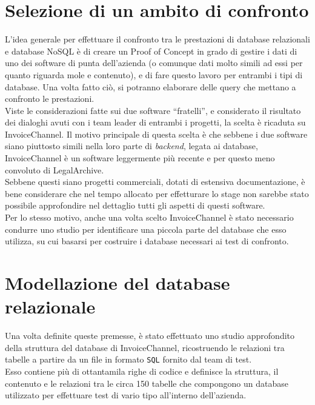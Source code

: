 \section{Selezione di un ambito di confronto}
L'idea generale per effettuare il confronto tra le prestazioni di database relazionali e database NoSQL è di creare un \gls{Proof of Concept} in grado di gestire i dati di uno dei software di punta dell'azienda (o comunque dati molto simili ad essi per quanto riguarda mole e contenuto), e di fare questo lavoro per entrambi i tipi di database. Una volta fatto ciò, si potranno elaborare delle query che mettano a confronto le prestazioni.\\

\noindent Viste le considerazioni fatte sui due software ``fratelli'', e considerato il risultato dei dialoghi avuti con i team leader di entrambi i progetti, la scelta è ricaduta su InvoiceChannel. Il motivo principale di questa scelta è che sebbene i due software siano piuttosto simili nella loro parte di \textit{backend}, legata ai database, InvoiceChannel è un software leggermente più recente e per questo meno convoluto di LegalArchive.\\
Sebbene questi siano progetti commerciali, dotati di estensiva documentazione, è bene considerare che nel tempo allocato per effetturare lo stage non sarebbe stato possibile approfondire nel dettaglio tutti gli aspetti di questi software.\\
Per lo stesso motivo, anche una volta scelto InvoiceChannel è stato necessario condurre uno studio per identificare una piccola parte del database che esso utilizza, su cui basarsi per costruire i database necessari ai test di confronto.\\


\section{Modellazione del database relazionale}
Una volta definite queste premesse, è stato effettuato uno studio approfondito della struttura del database di InvoiceChannel, ricostruendo le relazioni tra tabelle a partire da un file in formato \texttt{SQL} fornito dal team di test.\\
Esso contiene più di ottantamila righe di codice e definisce la struttura, il contenuto e le relazioni tra le circa 150 tabelle che compongono un database utilizzato per effettuare test di vario tipo all'interno dell'azienda.\\

